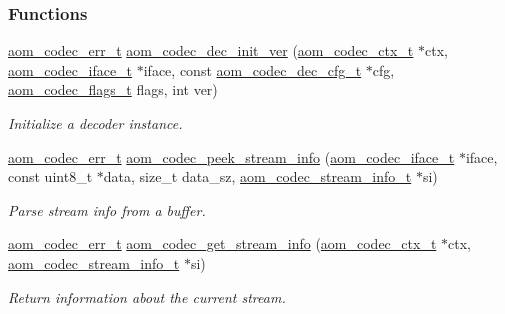 \subsubsection*{Functions}
\begin{DoxyCompactItemize}
\item 
\hyperlink{group__codec_gaaae61e0f8663e6137f1e228757248e7c}{aom\+\_\+codec\+\_\+err\+\_\+t} \hyperlink{group__decoder_gab2bfd2f5517b9452d2c71b7c2b2e8e8d}{aom\+\_\+codec\+\_\+dec\+\_\+init\+\_\+ver} (\hyperlink{group__codec_ga9a1d27f9742d9f70783e3c6cb849b5b4}{aom\+\_\+codec\+\_\+ctx\+\_\+t} $\ast$ctx, \hyperlink{group__codec_ga4ef55b44c762836d1550e11921bed403}{aom\+\_\+codec\+\_\+iface\+\_\+t} $\ast$iface, const \hyperlink{group__decoder_ga629c80380a9351796022345f655a5f3d}{aom\+\_\+codec\+\_\+dec\+\_\+cfg\+\_\+t} $\ast$cfg, \hyperlink{group__codec_ga18f2242c1afca329581fbd3f2c81721b}{aom\+\_\+codec\+\_\+flags\+\_\+t} flags, int ver)
\begin{DoxyCompactList}\small\item\em Initialize a decoder instance. \end{DoxyCompactList}\item 
\hyperlink{group__codec_gaaae61e0f8663e6137f1e228757248e7c}{aom\+\_\+codec\+\_\+err\+\_\+t} \hyperlink{group__decoder_ga2544bac9fdc439f0effd6b1b14df54be}{aom\+\_\+codec\+\_\+peek\+\_\+stream\+\_\+info} (\hyperlink{group__codec_ga4ef55b44c762836d1550e11921bed403}{aom\+\_\+codec\+\_\+iface\+\_\+t} $\ast$iface, const uint8\+\_\+t $\ast$data, size\+\_\+t data\+\_\+sz, \hyperlink{group__decoder_gab348c42a78bbbaa6488c84cdf3a28aaa}{aom\+\_\+codec\+\_\+stream\+\_\+info\+\_\+t} $\ast$si)
\begin{DoxyCompactList}\small\item\em Parse stream info from a buffer. \end{DoxyCompactList}\item 
\hyperlink{group__codec_gaaae61e0f8663e6137f1e228757248e7c}{aom\+\_\+codec\+\_\+err\+\_\+t} \hyperlink{group__decoder_ga2b456cf67b1b64dabed370c5d7514b29}{aom\+\_\+codec\+\_\+get\+\_\+stream\+\_\+info} (\hyperlink{group__codec_ga9a1d27f9742d9f70783e3c6cb849b5b4}{aom\+\_\+codec\+\_\+ctx\+\_\+t} $\ast$ctx, \hyperlink{group__decoder_gab348c42a78bbbaa6488c84cdf3a28aaa}{aom\+\_\+codec\+\_\+stream\+\_\+info\+\_\+t} $\ast$si)
\begin{DoxyCompactList}\small\item\em Return information about the current stream. \end{DoxyCompactList}\item 

\end{DoxyCompactItemize}
